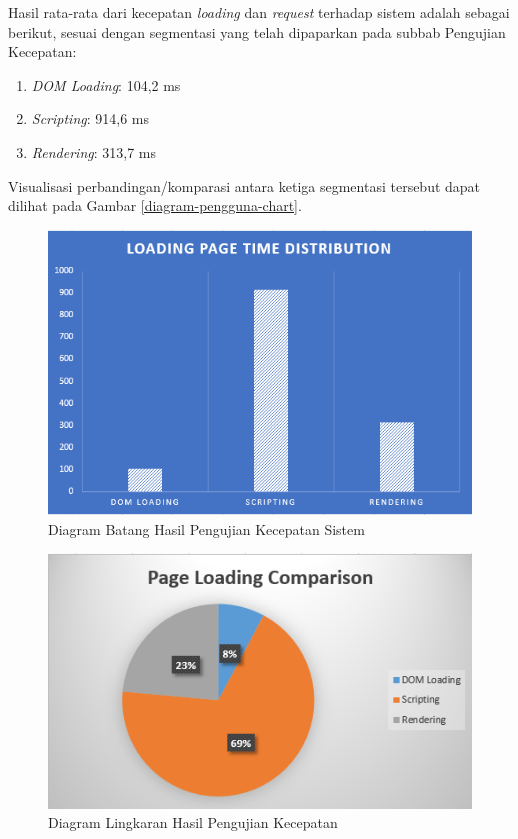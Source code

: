 Hasil rata-rata dari kecepatan \textit{loading} dan \textit{request} terhadap sistem adalah sebagai berikut, sesuai dengan segmentasi yang telah dipaparkan pada subbab Pengujian Kecepatan:
\begin{enumerate}
	\item \textit{DOM Loading}: 104,2 ms
	\item \textit{Scripting}: 914,6 ms
	\item \textit{Rendering}: 313,7 ms
\end{enumerate}

Visualisasi perbandingan/komparasi antara ketiga segmentasi tersebut dapat dilihat pada Gambar \ref{diagram-pengguna-chart}.

\begin{figure}[H]
	\centering
	\includegraphics[width=.9\textwidth]{images/bab5/speed/bar-chart.png}
	\caption{Diagram Batang Hasil Pengujian Kecepatan Sistem }
	\label{chart-speed-test}
\end{figure}

\begin{figure}[H]
	\centering
	\includegraphics[width=\textwidth]{images/bab5/speed/circle-chart.png}
	\caption{Diagram Lingkaran Hasil Pengujian Kecepatan}
	\label{circle-chart-speed-test}
\end{figure}

